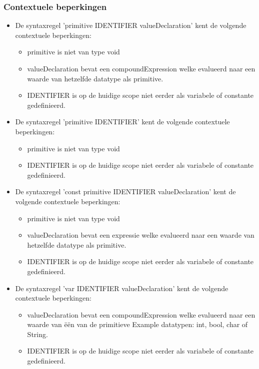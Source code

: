     \subsubsection{Contextuele beperkingen}
        \begin{itemize}
        \item De syntaxregel 'primitive IDENTIFIER valueDeclaration' kent de volgende contextuele beperkingen:
            \begin{itemize}
            \item primitive is niet van type void
            \item valueDeclaration bevat een compoundExpression welke evalueerd naar een waarde van hetzelfde datatype als primitive.
            \item IDENTIFIER is op de huidige scope niet eerder als variabele of constante gedefinieerd.
            \end{itemize}        
        \item De syntaxregel 'primitive IDENTIFIER' kent de volgende contextuele beperkingen:
            \begin{itemize}
            \item primitive is niet van type void
            \item IDENTIFIER is op de huidige scope niet eerder als variabele of constante gedefinieerd.
            \end{itemize}  
        \item De syntaxregel 'const primitive IDENTIFIER valueDeclaration' kent de volgende contextuele beperkingen:
            \begin{itemize}
            \item primitive is niet van type void
            \item valueDeclaration bevat een expressie welke evalueerd naar een waarde van hetzelfde datatype als primitive.
            \item IDENTIFIER is op de huidige scope niet eerder als variabele of constante gedefinieerd.
            \end{itemize}  
        \item De syntaxregel 'var IDENTIFIER valueDeclaration' kent de volgende contextuele beperkingen:
            \begin{itemize}
            \item valueDeclaration bevat een compoundExpression welke evalueerd naar een waarde van \"{e}\"{e}n van de primitieve Example datatypen: int, bool, char of String.
            \item IDENTIFIER is op de huidige scope niet eerder als variabele of constante gedefinieerd.

\end{itemize}
\end{itemize}
